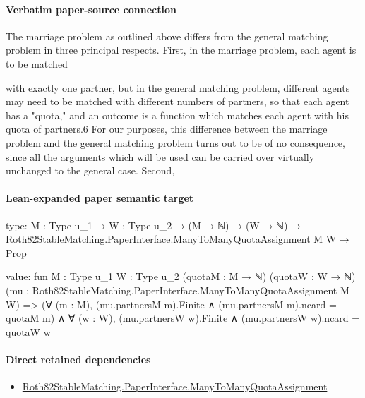 \documentclass[10pt]{article}
\begin{document}
\paragraph{Verbatim paper-source connection}
\begin{ReviewVerbatim}
The marriage problem as outlined above differs from the general matching problem
in three principal respects. First, in the marriage problem, each agent is to be matched

with exactly one partner, but in the general matching problem, different agents may
need to be matched with different numbers of partners, so that each agent has a
"quota," and an outcome is a function which matches each agent with his quota of
partners.6 For our purposes, this difference between the marriage problem and the
general matching problem turns out to be of no consequence, since all the arguments
which will be used can be carried over virtually unchanged to the general case. Second,
\end{ReviewVerbatim}



\paragraph{Lean-expanded paper semantic target}
\begin{ReviewVerbatim}
type:
{M : Type u_1} →
  {W : Type u_2} → (M → ℕ) → (W → ℕ) → Roth82StableMatching.PaperInterface.ManyToManyQuotaAssignment M W → Prop

value:
fun {M : Type u_1} {W : Type u_2} (quotaM : M → ℕ) (quotaW : W → ℕ)
    (mu : Roth82StableMatching.PaperInterface.ManyToManyQuotaAssignment M W) =>
  (∀ (m : M), (mu.partnersM m).Finite ∧ (mu.partnersM m).ncard = quotaM m) ∧
    ∀ (w : W), (mu.partnersW w).Finite ∧ (mu.partnersW w).ncard = quotaW w
\end{ReviewVerbatim}

\paragraph{Direct retained dependencies}
\begin{itemize}\raggedright
\item \hyperlink{governing-declaration-0f7292fceafe9196}{Roth82\allowbreak{}Stable\allowbreak{}Matching.\allowbreak{}Paper\allowbreak{}Interface.\allowbreak{}Many\allowbreak{}To\allowbreak{}Many\allowbreak{}Quota\allowbreak{}Assignment}
\end{itemize}
\end{document}
